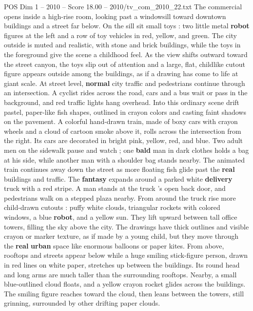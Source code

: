 \begin{textsample}{POS Dim 1 – 2010 – Score 18.00 – 2010/tv\_com\_2010\_22.txt}  \label{ex:f1_pos_021}
The commercial opens inside a high-rise room, looking past a windowsill toward downtown buildings and a street far below.
On the sill sit small toys : two little metal \textbf{robot} figures at the left and a row of toy vehicles in red, yellow, and green.
The city outside is muted and realistic, with stone and brick buildings, while the toys in the foreground give the scene a childhood feel.
As the view shifts outward toward the street canyon, the toys slip out of attention and a large, flat, childlike cutout figure appears outside among the buildings, as if a drawing has come to life at giant scale.
At street level, \textbf{normal} city traffic and pedestrians continue through an intersection.
A cyclist rides across the road, cars and a bus wait or pass in the background, and red traffic lights hang overhead.
Into this ordinary scene drift pastel, paper-like fish shapes, outlined in crayon colors and casting faint shadows on the pavement.
A colorful hand-drawn train, made of boxy cars with crayon wheels and a cloud of cartoon smoke above it, rolls across the intersection from the right.
Its cars are decorated in bright pink, yellow, red, and blue.
Two adult men on the sidewalk pause and watch ; one \textbf{bald} man in dark clothes holds a bag at his side, while another man with a shoulder bag stands nearby.
The animated train continues away down the street as more floating fish glide past the \textbf{real} buildings and traffic.
The \textbf{fantasy} expands around a parked white \textbf{delivery} truck with a red stripe.
A man stands at the truck ’s open back door, and pedestrians walk on a stepped plaza nearby.
From around the truck rise more child-drawn cutouts : puffy white clouds, triangular rockets with colored windows, a blue \textbf{robot}, and a yellow sun.
They lift upward between tall office towers, filling the sky above the city.
The drawings have thick outlines and visible crayon or marker texture, as if made by a young child, but they move through the \textbf{real} \textbf{urban} space like enormous balloons or paper kites.
From above, rooftops and streets appear below while a huge smiling stick-figure person, drawn in red lines on white paper, stretches up between the buildings.
Its round head and long arms are much taller than the surrounding rooftops.
Nearby, a small blue-outlined cloud floats, and a yellow crayon rocket glides across the buildings.
The smiling figure reaches toward the cloud, then leans between the towers, still grinning, surrounded by other drifting paper clouds.

\end{textsample}
